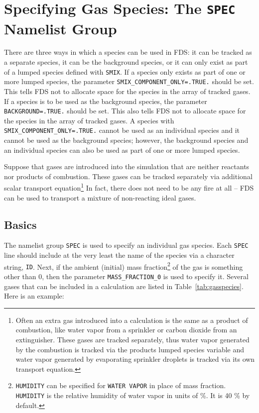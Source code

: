 \documentclass[11pt]{book}
\newcommand{\ct}{\tt\small}
\begin{document}
\section{Specifying Gas Species: The \texorpdfstring{{\tt SPEC}}{SPEC} Namelist Group}
\label{info:SPEC}

There are three ways in which a species can be used in FDS: it can be tracked as a separate species,
it can be the background species, or it can only exist as part of a lumped species defined with {\ct SMIX}.
If a species only exists as part of one or more lumped species, the parameter {\ct SMIX\_COMPONENT\_ONLY=.TRUE.} should be set.
This tells FDS not to allocate space for the species in the array of tracked gases.
If a species is to be used as the background species, the parameter {\ct BACKGROUND=.TRUE.} should be set.
This also tells FDS not to allocate space for the species in the array of tracked gases. A species with {\ct SMIX\_COMPONENT\_ONLY=.TRUE.}
cannot be used as an individual species and it cannot be used as the background species; however, the background species and an individual species
can also be used as part of one or more lumped species.


Suppose that gases are introduced into the simulation
that are neither reactants nor products of combustion.
These gases can be tracked separately via additional scalar transport equation\footnote{
Often an extra gas introduced into a calculation is the same as a
product of combustion, like water vapor from a sprinkler or carbon
dioxide from an extinguisher. These gases are tracked separately,
thus water vapor generated by the combustion is tracked via the
products lumped species variable and water vapor generated by evaporating
sprinkler droplets is tracked via its own transport equation.}
In fact, there does not need to be any fire
at all -- FDS can be used to transport a mixture of non-reacting
ideal gases.

\subsection{Basics}

\label{info:SPEC_Basics}

The namelist group {\ct SPEC} is used to specify an individual gas species. Each {\ct SPEC} line should include at the very least
the name of the species via a character string, {\ct ID}.
Next, if the ambient (initial) mass fraction\footnote{{\ct HUMIDITY} can be specified for {\ct WATER VAPOR} in place of mass fraction.
{\ct HUMIDITY} is the relative humidity of water vapor in units of \%. It is 40 \% by default.} of the gas is something
other than 0, then the parameter {\ct MASS\_FRACTION\_0} is used to
specify it. Several gases that can be included in a calculation are listed in
Table~\ref{tab:gasspecies}. Here is an example:
\end{document}
